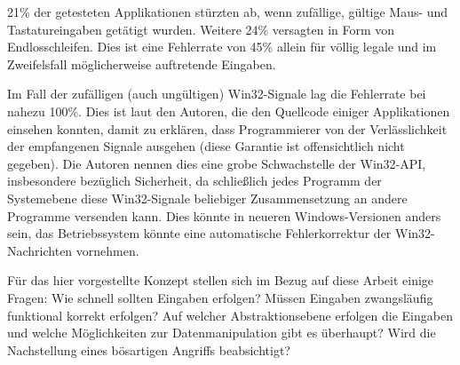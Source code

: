 21\% der getesteten Applikationen stürzten ab, wenn zufällige, gültige Maus- und Tastatureingaben 
getätigt wurden. Weitere 24\% versagten in Form von Endlosschleifen. Dies ist eine Fehlerrate von 45\%
allein für völlig legale und im Zweifelsfall möglicherweise auftretende Eingaben.

Im Fall der zufälligen (auch ungültigen) Win32-Signale lag die Fehlerrate bei nahezu 100\%. Dies ist
laut den Autoren, die den Quellcode einiger Applikationen einsehen konnten, damit zu erklären,
dass Programmierer von der Verlässlichkeit der empfangenen Signale ausgehen (diese Garantie ist offensichtlich
nicht gegeben). Die Autoren nennen dies eine grobe Schwachstelle der Win32-API, insbesondere bezüglich
Sicherheit, da schließlich jedes Programm der Systemebene diese Win32-Signale beliebiger Zusammensetzung
an andere Programme versenden kann. Dies könnte in neueren Windows-Versionen anders sein, das Betriebssystem
könnte eine automatische Fehlerkorrektur der Win32-Nachrichten vornehmen.

Für das hier vorgestellte Konzept stellen sich im Bezug auf diese Arbeit einige Fragen:
Wie schnell sollten Eingaben erfolgen? Müssen Eingaben zwangsläufig funktional korrekt erfolgen?
Auf welcher Abstraktionsebene erfolgen die Eingaben und welche Möglichkeiten zur Datenmanipulation
gibt es überhaupt? Wird die Nachstellung eines bösartigen Angriffs beabsichtigt?
